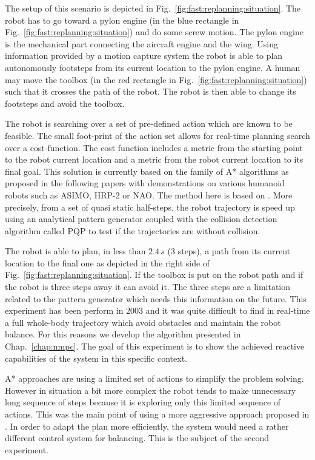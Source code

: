 The setup of this scenario is depicted in Fig.~\ref{fig:fast:replanning:situation}.
The robot has to go toward a pylon engine (in the blue rectangle in Fig.~\ref{fig:fast:replanning:situation}) and do some screw motion.
The pylon engine is the mechanical part connecting the aircraft engine and the wing.
Using information provided by a motion capture system the robot is able to plan autonomously footsteps from its current location to the pylon engine.
A human may move the toolbox (in the red rectangle in Fig.~\ref{fig:fast:replanning:situation}) such that it crosses the path of the robot.
The robot is then able to change its footsteps and avoid the toolbox.

The robot is searching over a set of pre-defined action which are known to be feasible.
The small foot-print of the action set allows for real-time planning search over a cost-function.
The cost function includes a metric from the starting point to the robot current location and a metric from the robot current location to its final goal. 
This solution is currently based on the family of A* algorithms as proposed in the following papers 
\cite{Chestnutt:2010:MPHR,Kuffner2002, Hornung:ICHR:12} with demonstrations on various humanoid robots such as ASIMO, HRP-2 or NAO.
The method here is based on \cite{perrin:itro:12}.
More precisely, from a set of quasi static half-steps, the robot trajectory is speed up using an analytical pattern generator coupled with the collision detection algorithm called PQP to test if the trajectories are without collision.

The robot is able to plan, in less than $2.4\,s$ (3 steps), a path from its current location to the final one as depicted in the right side of Fig.~\ref{fig:fast:replanning:situation}. 
If the toolbox is put on the robot path and if the robot is three steps away it can avoid it. 
The three steps are a limitation related to the pattern generator which needs this information on the future.
This experiment has been perform in 2003 and it was quite difficult to find in real-time a full whole-body trajectory which avoid obstacles and maintain the robot balance.
For this reasons we develop the algorithm presented in Chap.~\ref{chap:nmpc}.
The goal of this experiment is to show the achieved reactive capabilities of the system in this specific context.

A* approaches are using a limited set of actions to simplify the problem solving. 
However in situation a bit more complex the robot tends to make unnecessary long sequence of steps because 
it is exploring only this limited sequence of actions. This was the main point of using a more aggressive approach proposed in \cite{perrin:itro:12}. 
In order to adapt the plan more efficiently, the system would need a rather different control system for balancing.
This is the subject of the second experiment. 
